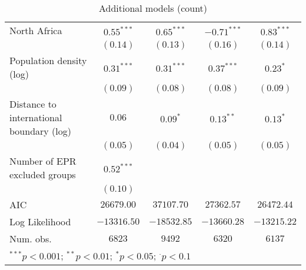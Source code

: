 \begin{sidewaystable}
\begin{center}
{\begin{tabular}{l c c c c}
North Africa                             & $0.55^{***}$ & $0.65^{***}$    & $-0.71^{***}$ & $0.83^{***}$  \\
                                         & $(0.14)$     & $(0.13)$        & $(0.16)$      & $(0.14)$      \\
Population density (log)                 & $0.31^{***}$ & $0.31^{***}$    & $0.37^{***}$  & $0.23^{*}$    \\
                                         & $(0.09)$     & $(0.08)$        & $(0.08)$      & $(0.09)$      \\
Distance to international boundary (log) & $0.06$       & $0.09^{*}$      & $0.13^{**}$   & $0.13^{*}$    \\
                                         & $(0.05)$     & $(0.04)$        & $(0.05)$      & $(0.05)$      \\
Number of EPR excluded groups            & $0.52^{***}$ &                 &               &               \\
                                         & $(0.10)$     &                 &               &               \\
\midrule
AIC                                      & $26679.00$   & $37107.70$      & $27362.57$    & $26472.44$    \\
Log Likelihood                           & $-13316.50$  & $-18532.85$     & $-13660.28$   & $-13215.22$   \\
Num. obs.                                & $6823$       & $9492$          & $6320$        & $6137$        \\
\bottomrule
\multicolumn{5}{l}{\scriptsize{$^{***}p<0.001$; $^{**}p<0.01$; $^{*}p<0.05$; $^{\cdot}p<0.1$}}
\end{tabular}
}
\caption{Additional models (count)}
\label{robustc}
\end{center}
\end{sidewaystable}
